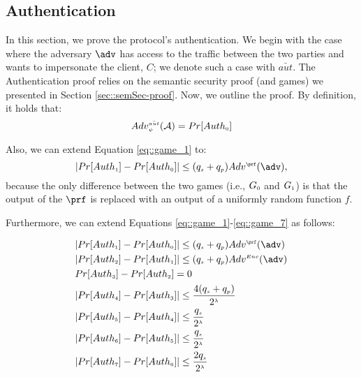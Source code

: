 


\subsection{Authentication}

In this section, we prove the protocol's authentication. We begin with the case where the adversary $\adv$ has access to the traffic between the two parties and wants to impersonate the client, $C$; we denote such a case with $\bar {aut}$. The Authentication proof relies on the semantic security proof (and games) we presented in Section \ref{sec::semSec-proof}.  Now, we outline the proof.  By definition, it holds that:
%
 \begin{equation}\label{eq::adv-ake}
Adv_{\scriptscriptstyle \psi}^{\scriptscriptstyle \bar {aut}}(\mathcal{A})=Pr[Auth_{\scriptscriptstyle  0}]
\end{equation}


Also, we can extend Equation \ref{eq::game_1} to:
%
\begin{equation*}
|Pr[Auth_{\sss  1}]-Pr[Auth_{\sss  0}]| \leq (q_{\sss s}+q_{\sss p})Adv^{\sss\prf}(\adv),
\end{equation*}
%
 because the only difference between the two games (i.e., $G_{\scriptscriptstyle  0}$ and $G_{\scriptscriptstyle  1}$) is that the output of the $\prf$ is replaced with an output of a uniformly random function $f$. 
 
 
 Furthermore, we can extend Equations \ref{eq::game_1}-\ref{eq::game_7} as follows: 
 
 
 \begin{equation*}
 \begin{split}
  &  |Pr[Auth_{\sss  1}]-Pr[Auth_{\sss  0}]| \leq (q_{\sss s}+q_{\sss p}) Adv^{\sss \prf}(\adv) \\ 
 &  |Pr[Auth_{\sss  2}]-Pr[Auth_{\sss 1}]| \leq (q_{\sss s}+q_{\sss p}) Adv^{\sss Enc}(\adv) \\ 
 & Pr[Auth_{\sss  3}]-Pr[Auth_{\sss  2}]=0\\
 & |Pr[Auth_{\sss  4}]-Pr[Auth_{\sss  3}]|\leq \frac{4(q_{\sss  s}+q_{\sss  p})}{2^{\sss \lambda}}\\
 & |Pr[Auth_{\sss  5}]-Pr[Auth_{\sss  4}]|\leq \frac{q_{\sss  s}}{2^{\sss \lambda}}\\
 & |Pr[Auth_{\sss  6}]-Pr[Auth_{\sss  5}]|\leq \frac{q_{\sss  s}}{2^{\sss \lambda}}\\
 & |Pr[Auth_{\sss  7}]-Pr[Auth_{\sss  6}]|\leq \frac{2q_{\sss  s}}{2^{\sss \lambda}}
\end{split}
\end{equation*}

